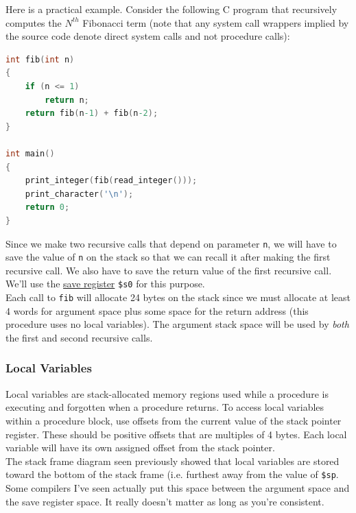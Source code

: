 \documentclass[12pt]{article}
\begin{document}
Here is a practical example. Consider the following C program that recursively
     computes the $N^{th}$ Fibonacci term (note that any system call wrappers
     implied by the source code denote direct system calls and not procedure
     calls):\\

\begin{lstlisting}[language=C]
int fib(int n)
{
    if (n <= 1)
        return n;
    return fib(n-1) + fib(n-2);
}

int main()
{
    print_integer(fib(read_integer()));
    print_character('\n');
    return 0;
}
\end{lstlisting}

Since we make two recursive calls that depend on parameter \texttt{n}, we will
     have to save the value of \texttt{n} on the stack so that we can recall it
     after making the first recursive call. We also have to save the return
     value of the first recursive call. We'll use the
     \hyperref[sec:saveregs]{save register} \texttt{\$s0} for this purpose.\\

Each call to \texttt{fib} will allocate 24 bytes on the stack since we must
     allocate at least 4 words for argument space plus some space for the return
     address (this procedure uses no local variables). The argument stack space
     will be used by \textit{both} the first and second recursive calls.\\



\newpage
\subsubsection{Local Variables}

Local variables are stack-allocated memory regions used while a procedure is
     executing and forgotten when a procedure returns. To access local variables
     within a procedure block, use offsets from the current value of the stack
     pointer register. These should be positive offsets that are multiples of 4
     bytes. Each local variable will have its own assigned offset from the stack
     pointer.\\

The stack frame diagram seen previously showed that local variables are stored
     toward the bottom of the stack frame (i.e. furthest away from the value of
     \texttt{\$sp}. Some compilers I've seen actually put this space between the
     argument space and the save register space. It really doesn't matter as
     long as you're consistent.\\
\end{document}
